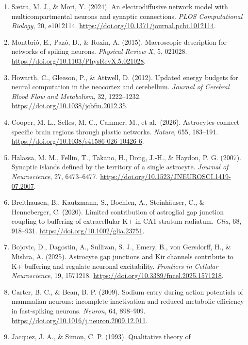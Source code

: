 \documentclass[
  11pt,
]{article}
\begin{document}
\begin{enumerate}
  space---A computational study. \emph{PLOS Computational Biology}, 19,
  e1010996. \url{https://doi.org/10.1371/journal.pcbi.1010996}.
\item
  Sætra, M. J., \& Mori, Y. (2024). An electrodiffusive network model
  with multicompartmental neurons and synaptic connections. \emph{PLOS
  Computational Biology}, 20, e1012114.
  \url{https://doi.org/10.1371/journal.pcbi.1012114}.
\item
  Montbrió, E., Pazó, D., \& Roxin, A. (2015). Macroscopic description
  for networks of spiking neurons. \emph{Physical Review X}, 5, 021028.
  \url{https://doi.org/10.1103/PhysRevX.5.021028}.
\item
  Howarth, C., Gleeson, P., \& Attwell, D. (2012). Updated energy
  budgets for neural computation in the neocortex and cerebellum.
  \emph{Journal of Cerebral Blood Flow and Metabolism}, 32, 1222--1232.
  \url{https://doi.org/10.1038/jcbfm.2012.35}.
\item
  Cooper, M. L., Selles, M. C., Cammer, M., et al.~(2026). Astrocytes
  connect specific brain regions through plastic networks.
  \emph{Nature}, 655, 183--191.
  \url{https://doi.org/10.1038/s41586-026-10426-6}.
\item
  Halassa, M. M., Fellin, T., Takano, H., Dong, J.-H., \& Haydon, P. G.
  (2007). Synaptic islands defined by the territory of a single
  astrocyte. \emph{Journal of Neuroscience}, 27, 6473--6477.
  \url{https://doi.org/10.1523/JNEUROSCI.1419-07.2007}.
\item
  Breithausen, B., Kautzmann, S., Boehlen, A., Steinhäuser, C., \&
  Henneberger, C. (2020). Limited contribution of astroglial gap
  junction coupling to buffering of extracellular K+ in CA1 stratum
  radiatum. \emph{Glia}, 68, 918--931.
  \url{https://doi.org/10.1002/glia.23751}.
\item
  Bojovic, D., Dagostin, A., Sullivan, S. J., Emery, B., von Gersdorff,
  H., \& Mishra, A. (2025). Astrocyte gap junctions and Kir channels
  contribute to K+ buffering and regulate neuronal excitability.
  \emph{Frontiers in Cellular Neuroscience}, 19, 1571218.
  \url{https://doi.org/10.3389/fncel.2025.1571218}.
\item
  Carter, B. C., \& Bean, B. P. (2009). Sodium entry during action
  potentials of mammalian neurons: incomplete inactivation and reduced
  metabolic efficiency in fast-spiking neurons. \emph{Neuron}, 64,
  898--909. \url{https://doi.org/10.1016/j.neuron.2009.12.011}.
\item
  Jacquez, J. A., \& Simon, C. P. (1993). Qualitative theory of

\end{enumerate}
\end{document}
